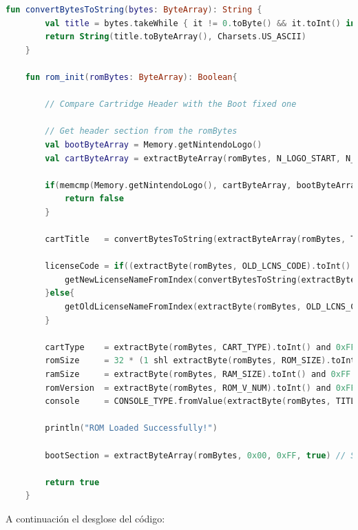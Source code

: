 \begin{lstlisting}[language=Kotlin, caption={Inicialización de la ROM y ejemplos de variables de clase.}, label={code:kotlinloadromread}]
    fun convertBytesToString(bytes: ByteArray): String {
        val title = bytes.takeWhile { it != 0.toByte() && it.toInt() in 32..126 } // Filter only ASCII characters
        return String(title.toByteArray(), Charsets.US_ASCII)
    }

    fun rom_init(romBytes: ByteArray): Boolean{

        // Compare Cartridge Header with the Boot fixed one

        // Get header section from the romBytes
        val bootByteArray = Memory.getNintendoLogo()
        val cartByteArray = extractByteArray(romBytes, N_LOGO_START, N_LOGO_END, true) // Nintendo Logo on Cartridge goes from 0x104 to 0x133

        if(memcmp(Memory.getNintendoLogo(), cartByteArray, bootByteArray.size) != 0){
            return false
        }

        cartTitle   = convertBytesToString(extractByteArray(romBytes, TITLE_START, TITLE_END, true))

        licenseCode = if((extractByte(romBytes, OLD_LCNS_CODE).toInt() and 0xFF) == NEW_LICENSE_CODE){
            getNewLicenseNameFromIndex(convertBytesToString(extractByteArray(romBytes, LCNS_CODE_START, LCNS_CODE_END, true)))
        }else{
            getOldLicenseNameFromIndex(extractByte(romBytes, OLD_LCNS_CODE).toInt() and 0xFF)
        }

        cartType    = extractByte(romBytes, CART_TYPE).toInt() and 0xFF
        romSize     = 32 * (1 shl extractByte(romBytes, ROM_SIZE).toInt() and 0xFF) // Value in KiB
        ramSize     = extractByte(romBytes, RAM_SIZE).toInt() and 0xFF
        romVersion  = extractByte(romBytes, ROM_V_NUM).toInt() and 0xFF
        console     = CONSOLE_TYPE.fromValue(extractByte(romBytes, TITLE_END).toInt() and 0xFF)

        println("ROM Loaded Successfully!")

        bootSection = extractByteArray(romBytes, 0x00, 0xFF, true) // Save portion of code where the boot is going to load

        return true
    }
\end{lstlisting}

A continuación el desglose del código:

